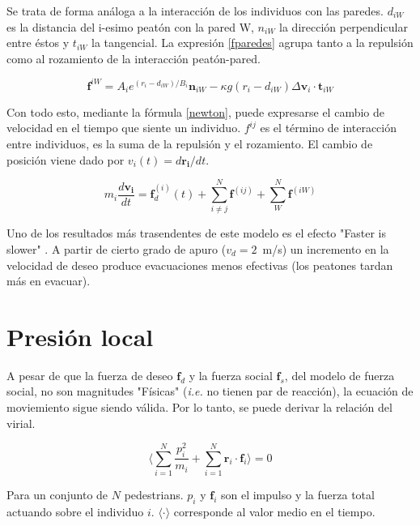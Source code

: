 Se trata de forma análoga a la interacción de los individuos con las paredes. $d_{iW}$ es la distancia del i-esimo peatón con la pared W, $n_{iW}$ la dirección perpendicular entre éstos y $t_{iW}$ la tangencial. La expresión \ref{fparedes} agrupa tanto a la repulsión como al rozamiento de la interacción peatón-pared.

\begin{equation}
\mathbf{f}^{iW}=A_ie^{(r_{i}-d_{iW})/B_i}\mathbf{n}_{iW}-\kappa g(r_{i}-d_{iW})\Delta \mathbf{v}_{i}\cdot\mathbf{t}_{iW}
\label{fparedes}
\end{equation} 

Con todo esto, mediante la fórmula \ref{newton}, puede expresarse el cambio de velocidad en el tiempo que siente un individuo. $f^{ij}$ es el término de interacción entre individuos, es la suma de la repulsión y el rozamiento. El cambio de posición viene dado por $v_{i}(t)=d\mathbf{r_i}/dt$.

\begin{equation}
m_i\frac{d\mathbf{v_i}}{dt}=\mathbf{f}_d^ {(i)}(t)+ \sum_{i\neq j}^{N}\mathbf{f}^{(ij)} + \sum_{W}^{N}\mathbf{f}^{(iW)}
\label{newton}
\end{equation}  

Uno de los resultados más trasendentes de este modelo es el efecto "Faster is slower" \cite{Helbing1}. A partir de cierto grado de apuro ($v_d=2$~m/s) un incremento en la velocidad de deseo produce evacuaciones menos efectivas (los peatones tardan más en evacuar). 
 
\section{Presión local}

A pesar de que la fuerza de deseo $\mathbf{f}_d$ y la fuerza social $\mathbf{f}_s$, del modelo de fuerza social, no son magnitudes "Físicas" (\textit{i.e.} no tienen par de reacción), la ecuación de moviemiento sigue siendo válida. Por lo tanto, se puede derivar la relación del virial\cite{lion}. 

\begin{equation}
 \bigg\langle\displaystyle\sum_{i=1}^N\displaystyle\frac{p_i^2}{m_i} + 
\displaystyle\sum_{i=1}^N 
\mathbf{r}_i\cdot\mathbf{f}_i\bigg\rangle=0\label{virial1}
\end{equation}


\noindent Para un conjunto de $N$ pedestrians. $p_i$  y $\mathbf{f}_i$ son el impulso y la fuerza total actuando sobre el individuo $i$. $\langle\cdot\rangle$ corresponde al valor medio en el tiempo.  \\

